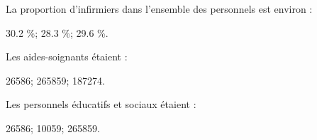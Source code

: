 \begin{questions}
	\question La proportion d'infirmiers dans l'ensemble des personnels est environ :
	
	\begin{oneparchoices}
		\choice \num{30.2} \%;
		\CorrectChoice \num{28.3} \%;
		\choice \num{29.6} \%.
		
	\end{oneparchoices} 

	\question Les aides-soignants étaient :
	
	\begin{oneparchoices}
		\choice \num{26586};
		\choice \num{265859};
		\CorrectChoice \num{187274}.
		
	\end{oneparchoices} 

	\question Les personnels éducatifs et sociaux étaient :
	
	\begin{oneparchoices}
		\choice \num{26586};
		\CorrectChoice \num{10059};
		\choice \num{265859}.
		
	\end{oneparchoices} 
\end{questions}